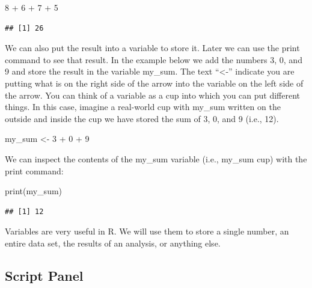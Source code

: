 \documentclass[
]{krantz}
\makeatletter
\newenvironment{Shaded}{\begin{snugshade}}{\end{snugshade}}
\newcommand{\DecValTok}[1]{\textcolor[rgb]{0.06,0.06,0.06}{#1}}
\newcommand{\FunctionTok}[1]{\textcolor[rgb]{0,0,0}{#1}}
\newcommand{\NormalTok}[1]{#1}
\newcommand{\OtherTok}[1]{\textcolor[rgb]{0.37,0.37,0.37}{#1}}
\newcommand{\SpecialCharTok}[1]{\textcolor[rgb]{0,0,0}{#1}}
\newenvironment{kframe}{%
\medskip{}
\setlength{\fboxsep}{.8em}
 \def\at@end@of@kframe{}%
 \ifinner\ifhmode%
  \def\at@end@of@kframe{\end{minipage}}%
  \begin{minipage}{\columnwidth}%
 \fi\fi%
 \def\FrameCommand##1{\hskip\@totalleftmargin \hskip-\fboxsep
 \colorbox{shadecolor}{##1}\hskip-\fboxsep
     \hskip-\linewidth \hskip-\@totalleftmargin \hskip\columnwidth}%
 \MakeFramed {\advance\hsize-\width
   \@totalleftmargin\z@ \linewidth\hsize
   \@setminipage}}%
 {\par\unskip\endMakeFramed%
 \at@end@of@kframe}
\renewenvironment{Shaded}{\begin{kframe}}{\end{kframe}}
\makeatother
\begin{document}
\begin{Shaded}
\begin{Highlighting}[]
\DecValTok{8} \SpecialCharTok{+} \DecValTok{6} \SpecialCharTok{+} \DecValTok{7} \SpecialCharTok{+} \DecValTok{5}
\end{Highlighting}
\end{Shaded}

\begin{verbatim}
## [1] 26
\end{verbatim}

We can also put the result into a variable to store it. Later we can use the print command to see that result. In the example below we add the numbers 3, 0, and 9 and store the result in the variable my\_sum. The text ``\textless-'' indicate you are putting what is on the right side of the arrow into the variable on the left side of the arrow. You can think of a variable as a cup into which you can put different things. In this case, imagine a real-world cup with my\_sum written on the outside and inside the cup we have stored the sum of 3, 0, and 9 (i.e., 12).

\begin{Shaded}
\begin{Highlighting}[]
\NormalTok{my\_sum }\OtherTok{\textless{}{-}} \DecValTok{3} \SpecialCharTok{+} \DecValTok{0} \SpecialCharTok{+} \DecValTok{9}
\end{Highlighting}
\end{Shaded}

We can inspect the contents of the my\_sum variable (i.e., my\_sum cup) with the print command:

\begin{Shaded}
\begin{Highlighting}[]
\FunctionTok{print}\NormalTok{(my\_sum)}
\end{Highlighting}
\end{Shaded}

\begin{verbatim}
## [1] 12
\end{verbatim}

Variables are very useful in R. We will use them to store a single number, an entire data set,
the results of an analysis, or anything else.

\hypertarget{script-panel}{%
\subsection{Script Panel}\label{script-panel}}
\end{document}
